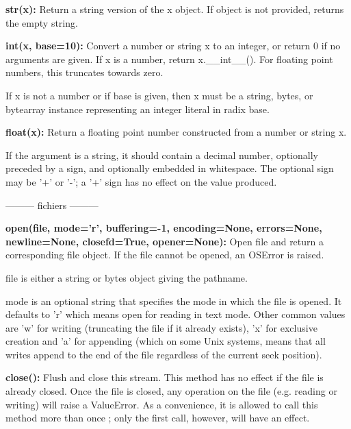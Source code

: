 \documentclass[11pt,fleqn]{book} %
\begin{document}
\textsf{\textbf{str(x):}} Return a string version of the x object. If object is not provided, returns the empty string.

\vspace{.5cm}

\textsf{\textbf{int(x, base=10):}} Convert a number or string x to an integer, or return 0 if no arguments are given. If x is a number, return x.\_\_int\_\_(). For floating point numbers, this truncates towards zero.

If x is not a number or if base is given, then x must be a string, bytes, or bytearray instance representing an integer literal in radix base.

\vspace{.5cm}

\textsf{\textbf{float(x):}} Return a floating point number constructed from a number or string x.

If the argument is a string, it should contain a decimal number, optionally preceded by a sign, and optionally embedded in whitespace. The optional sign may be '+' or '-'; a '+' sign has no effect on the value produced.

\begin{center}
--------- fichiers ---------
\end{center}

\textsf{\textbf{open(file, mode='r', buffering=-1, encoding=None, errors=None, newline=None,
closefd=True, opener=None):}} Open file and return a corresponding file object. If the file
cannot be opened, an OSError is raised.

file is either a string or bytes object giving the pathname.

mode is an optional string that specifies the mode in which the file is opened. It defaults
to 'r' which means open for reading in text mode. Other common values are 'w' for writing
(truncating the file if it already exists), 'x' for exclusive creation and 'a' for appending (which
on some Unix systems, means that all writes append to the end of the file regardless of the
current seek position).

\vspace{.5cm}

\textsf{\textbf{close():}} Flush and close this stream. This method has no effect if the file is already closed.
Once the file is closed, any operation on the file (e.g. reading or writing) will raise a ValueError.
As a convenience, it is allowed to call this method more than once ; only the first call, however,
will have an effect.
\end{document}
